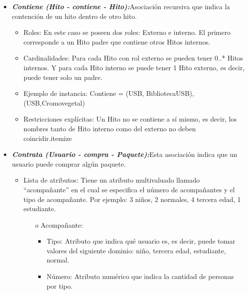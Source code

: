 \documentclass[a4paper]{article}
\begin{document}
\begin{itemize}

\item{

	\textbf{\textit{Contiene (Hito - contiene - Hito):}}Asociación recursiva que indica la contención de un hito dentro de otro hito.
  		
        
        
 \begin{itemize}
        
  \item Roles: En este caso se poseen dos roles: Externo e interno. El primero corresponde a un Hito padre que contiene otros Hitos internos.
\item Cardinalidades: Para cada Hito con rol externo se pueden tener 0..* Hitos internos. Y para cada Hito interno se puede tener 1 Hito externo, es decir, puede tener solo un padre.
\item Ejemplo de instancia: Contiene = {(USB, BibliotecaUSB), (USB,Cromovegetal)}
\item Restricciones explícitas: Un Hito no se contiene a sí mismo, es decir, los nombres tanto de Hito interno como del externo no deben coincidir.{itemize} 
  	
   \end{itemize}


}


\item{

	\textbf{\textit{Contrata (Usuario - compra - Paquete):}}Esta asociación indica que un usuario puede comprar algún paquete.
  		
        
        
 \begin{itemize}
        
  \item Lista de atributos: Tiene un atributo multivaluado llamado “acompañante” en el cual se especifica el número de acompañantes y el tipo de acompañante. Por ejemplo: 3 niños, 2 normales, 4 tercera edad, 1 estudiante.
  
  \begin{itemize}
  \item[$o$]Acompañante:
\begin{itemize}
 \item Tipo: Atributo que indica qué usuario es, es decir, puede tomar valores
del siguiente dominio: niño, tercera edad, estudiante, normal.
\item Número: Atributo numérico que indica la cantidad de personas por
tipo. 
\end{itemize}


\end{itemize}
\end{itemize}}
\end{itemize}
\end{document}
